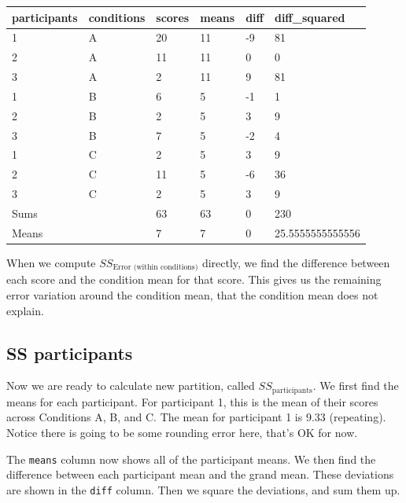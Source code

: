 \documentclass[
]{book}
\begin{document}
\begin{tabular}[t]{l|l|l|l|l|l}
\hline
participants & conditions & scores & means & diff & diff\_squared\\
\hline
1 & A & 20 & 11 & -9 & 81\\
\hline
2 & A & 11 & 11 & 0 & 0\\
\hline
3 & A & 2 & 11 & 9 & 81\\
\hline
1 & B & 6 & 5 & -1 & 1\\
\hline
2 & B & 2 & 5 & 3 & 9\\
\hline
3 & B & 7 & 5 & -2 & 4\\
\hline
1 & C & 2 & 5 & 3 & 9\\
\hline
2 & C & 11 & 5 & -6 & 36\\
\hline
3 & C & 2 & 5 & 3 & 9\\
\hline
Sums &  & 63 & 63 & 0 & 230\\
\hline
Means &  & 7 & 7 & 0 & 25.5555555555556\\
\hline
\end{tabular}

When we compute \(SS_\text{Error (within conditions)}\) directly, we find the difference between each score and the condition mean for that score. This gives us the remaining error variation around the condition mean, that the condition mean does not explain.

\subsection{SS participants}\label{ss-participants}

Now we are ready to calculate new partition, called \(SS_\text{participants}\). We first find the means for each participant. For participant 1, this is the mean of their scores across Conditions A, B, and C. The mean for participant 1 is 9.33 (repeating). Notice there is going to be some rounding error here, that's OK for now.

The \texttt{means} column now shows all of the participant means. We then find the difference between each participant mean and the grand mean. These deviations are shown in the \texttt{diff} column. Then we square the deviations, and sum them up.
\end{document}
